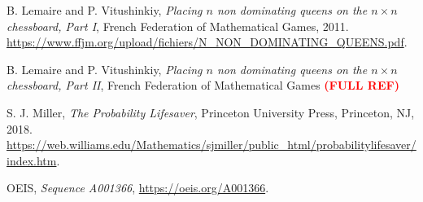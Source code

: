 \documentclass[12pt,reqno]{amsart}
\newcommand{\bburl}[1]{\textcolor{blue}{\url{#1}}}
\numberwithin{equation}{section}
\theoremstyle{plain}
\newcommand{\fix}[1]{\textcolor{red}{\textbf{\large (#1)\normalsize}}}
\begin{document}
\begin{thebibliography}{99999} %

B. Lemaire and P. Vitushinkiy, \emph{Placing $n$ non dominating queens on the $n \times n$ chessboard, Part I}, French Federation of Mathematical Games, 2011. \bburl{https://www.ffjm.org/upload/fichiers/N_NON_DOMINATING_QUEENS.pdf}.

B. Lemaire and P. Vitushinkiy, \emph{Placing $n$ non dominating queens on the $n \times n$ chessboard, Part II}, French Federation of Mathematical Games \fix{FULL REF}

S. J. Miller, \emph{The Probability Lifesaver}, Princeton University Press, Princeton, NJ, 2018. \bburl{https://web.williams.edu/Mathematics/sjmiller/public_html/probabilitylifesaver/index.htm}.


OEIS, \emph{Sequence A001366},  \bburl{https://oeis.org/A001366}.

\end{thebibliography}


\ \\
\end{document}
